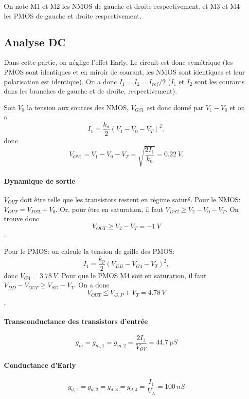 \documentclass[frenchb,DIV=14]{scrartcl}
\begin{document}
On note M1 et M2 les NMOS de gauche et droite respectivement, et M3 et M4 les PMOS
de gauche et droite respectivement.

\subsection*{Analyse DC}

Dans cette partie, on néglige l'effet Early. Le circuit est donc symétrique (les PMOS
sont identiques et en miroir de courant, les NMOS sont identiques et leur polarisation
est identique). On a donc $I_1 = I_2 = I_{ref}/2$ ($I_1$ et $I_2$ sont les courants dans
les branches de gauche et de droite, respectivement).

Soit $V_0$ la tension aux sources des NMOS, $V_{GS1}$ est donc donné
par $V_1-V_0$ et on a
\[I_1 = \frac{k_n}{2}\left(V_1-V_0-V_T\right)^2,\]
donc
\[V_{OV1} = V_1-V_0-V_T = \sqrt{\frac{2I_1}{k_n}} = \SI{0.22}{V}.\]

\paragraph{Dynamique de sortie}
$V_{OUT}$ doit être telle que les transistors restent
en régime saturé. Pour le NMOS: $V_{OUT} = V_{DS2} + V_0$.
Or, pour être en saturation, il faut $V_{DS2} \ge V_2 - V_0 - V_T$.
On trouve donc
\[V_{OUT} \ge V_2 - V_T = \SI{-1}{V}\].

Pour le PMOS: on calcule la tension de grille des PMOS:
\[I_1 = \frac{k_p}{2}\left(V_{DD}-V_{G4}-V_T\right)^2,\]
donc $V_{G4} = \SI{3.78}{V}$. Pour que le PMOS M4 soit en
saturation, il faut $V_{DD} - V_{OUT} \ge V_{SG} - V_T$.
On a donc
\[V_{OUT} \le V_{G,P}+V_T = \SI{4.78}{V}\].

\paragraph{Transconductance des transistors d'entrée}
\[g_m = g_{m,1} = g_{m,2} = \frac{2I_1}{V_{OV}} = \SI{44.7}{\micro S}\]

\paragraph{Conductance d'Early}
\[g_{d,1} = g_{d,2} = g_{d,3} = g_{d,4} = \frac{I_1}{V_A} = \SI{100}{nS}\]
\end{document}
